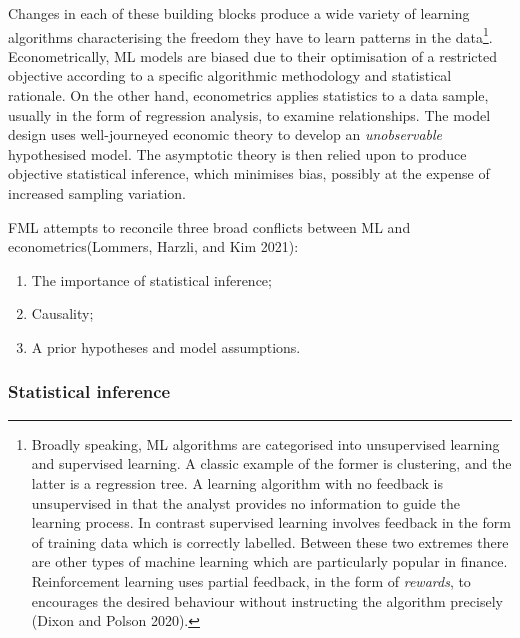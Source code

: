\documentclass{article}
\begin{document}
Changes in each of these building blocks produce a wide variety of
learning algorithms characterising the freedom they have to learn
patterns in the data\footnote{Broadly speaking, ML algorithms are
  categorised into unsupervised learning and supervised learning. A
  classic example of the former is clustering, and the latter is a
  regression tree. A learning algorithm with no feedback is unsupervised
  in that the analyst provides no information to guide the learning
  process. In contrast supervised learning involves feedback in the form
  of training data which is correctly labelled. Between these two
  extremes there are other types of machine learning which are
  particularly popular in finance. Reinforcement learning uses partial
  feedback, in the form of \emph{rewards}, to encourages the desired
  behaviour without instructing the algorithm precisely (Dixon and
  Polson 2020).}. Econometrically, ML models are biased due to their
optimisation of a restricted objective according to a specific
algorithmic methodology and statistical rationale. On the other hand,
econometrics applies statistics to a data sample, usually in the form of
regression analysis, to examine relationships. The model design uses
well-journeyed economic theory to develop an \emph{unobservable}
hypothesised model. The asymptotic theory is then relied upon to produce
objective statistical inference, which minimises bias, possibly at the
expense of increased sampling variation.

FML attempts to reconcile three broad conflicts between ML and
econometrics(Lommers, Harzli, and Kim 2021):

\begin{enumerate}
\def\labelenumi{\arabic{enumi}.}
\tightlist
\item
  The importance of statistical inference;
\item
  Causality;
\item
  A prior hypotheses and model assumptions.
\end{enumerate}

\hypertarget{statistical-inference}{%
\subsubsection{Statistical inference}\label{statistical-inference}}
\end{document}
